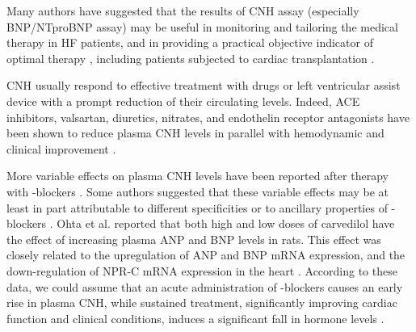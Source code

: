 \documentclass[14pt,a4paper,onecolumn]{extarticle}
\begin{document}
Many authors have suggested that the results of CNH assay (especially BNP/NTproBNP assay) may be useful in monitoring and tailoring the medical therapy in HF patients, and in providing a practical objective indicator of optimal therapy \citep{bib361} \citep{bib362} \citep{bib363} \citep{bib364} \citep{bib365} \citep{bib368} \citep{bib369} \citep{bib370} \citep{bib385} \citep{bib390} \citep{bib3168} \citep{bib3252} \citep{bib3253} \citep{bib3286} \citep{bib3255} \citep{bib3256} \citep{bib3257} \citep{bib3258} \citep{bib3259} \citep{bib3260} \citep{bib3261} \citep{bib3262} \citep{bib3263} \citep{bib3264}  \citep{bib3265}, including patients subjected to cardiac transplantation \citep{bib3266}.

CNH usually respond to effective treatment with drugs \citep{bib35} \citep{bib361} \citep{bib362} \citep{bib363} \citep{bib364} \citep{bib365} or left ventricular assist device \citep{bib3267} \citep{bib3268} with a prompt reduction of their circulating levels. Indeed, ACE inhibitors, valsartan, diuretics, nitrates, and endothelin receptor antagonists have been shown to reduce plasma CNH levels in parallel with hemodynamic and clinical improvement \citep{bib362} \citep{bib363} \citep{bib3252} \citep{bib3258} \citep{bib3271} \citep{bib3272} \citep{bib3273} \citep{bib3284} \citep{bib3275} \citep{bib3276} \citep{bib3277}.

More variable effects on plasma CNH levels have been reported after therapy with \beta-blockers \citep{bib390} \citep{bib3278} \citep{bib3279} \citep{bib3280} \citep{bib3281} \citep{bib3282} \citep{bib3283} \citep{bib3284} \citep{bib3285} \citep{bib3286} \citep{bib3287} \citep{bib3288} \citep{bib3289} \citep{bib3290} \citep{bib3291} \citep{bib3292}. Some authors suggested that these variable effects may be at least in part attributable to different specificities or to ancillary properties of \beta-blockers \citep{bib362}. Ohta et al. \citep{bib3293} reported that both high and low doses of carvedilol have the effect of increasing plasma ANP and BNP levels in rats. This effect was closely related to the upregulation of ANP and BNP mRNA expression, and the down-regulation of NPR-C mRNA expression in the heart \citep{bib3293}. According to these data, we could assume that an acute administration of \beta-blockers causes an early rise in plasma CNH, while sustained treatment, significantly improving cardiac function and clinical conditions, induces a significant fall in hormone levels \citep{bib390} \citep{bib3284} \citep{bib3287} \citep{bib3289} \citep{bib3290}.
\end{document}
